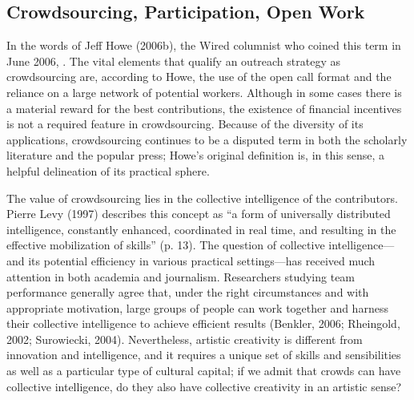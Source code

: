 \subsection{Crowdsourcing, Participation, Open Work}
In the words of Jeff Howe (2006b), the Wired columnist who coined this term in June 2006, . The vital elements that qualify an outreach strategy as crowdsourcing are, according to Howe, the use of the open call format and the reliance on a large network of potential workers. Although in some cases there is a material reward for the best contributions, the existence of financial incentives is not a required feature in crowdsourcing. Because of the diversity of its applications, crowdsourcing continues to be a disputed term in both the scholarly literature and the popular press; Howe’s original definition is, in this sense, a helpful delineation of its practical sphere.

The value of crowdsourcing lies in the collective intelligence of the contributors. Pierre Levy (1997) describes this concept as “a form of universally distributed intelligence, constantly enhanced, coordinated in real time, and resulting in the effective mobilization of skills” (p. 13). The question of collective intelligence—and its potential efficiency in various practical settings—has received much attention in both academia and journalism. Researchers studying team performance generally agree that, under the right circumstances and with appropriate motivation, large groups of people can work together and harness their collective intelligence to achieve efficient results (Benkler, 2006; Rheingold, 2002; Surowiecki, 2004). Nevertheless, artistic creativity is different from innovation and intelligence, and it requires a unique set of skills and sensibilities as well as a particular type of cultural capital; if we admit that crowds can have collective intelligence, do they also have collective creativity in an artistic sense?

